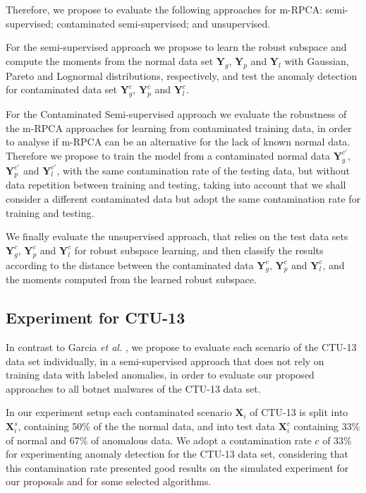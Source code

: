 Therefore, we propose to evaluate the following approaches for m-RPCA: semi-supervised; contaminated semi-supervised; and unsupervised.

For the semi-supervised approach we propose to learn the robust subspace and compute the moments from the normal data set $\pmb{Y}_g$, $\pmb{Y}_p$ and $\pmb{Y}_l$ with Gaussian, Pareto and Lognormal distributions, respectively, and test the anomaly detection for contaminated data set $\pmb{Y}_g^c$, $\pmb{Y}_p^c$ and $\pmb{Y}_l^c$.

For the Contaminated Semi-supervised approach we evaluate the robustness of the m-RPCA approaches for learning from contaminated training data, in order to analyse if m-RPCA can be an alternative for the lack of known normal data. Therefore we propose to train the model from a contaminated normal data $\pmb{Y}_g^{c'}$, $\pmb{Y}_p^{c'}$ and $\pmb{Y}_l^{c'}$, with the same contamination rate of the testing data, but without data repetition between training and testing, taking into account that we shall consider a different contaminated data but adopt the same contamination rate for training and testing.

We finally evaluate the unsupervised approach, that relies on the test data sets $\pmb{Y}_g^c$, $\pmb{Y}_p^c$ and $\pmb{Y}_l^c$ for robust subspace learning, and then classify the results according to the distance between the contaminated data $\pmb{Y}_g^c$, $\pmb{Y}_p^c$ and $\pmb{Y}_l^c$, and the moments computed from the learned robust subspace.

\subsection{Experiment for CTU-13}
\label{sec:4_CTU13Scenario}

In contrast to Garcia \emph{et al.} \cite{garcia2014empirical}, we propose to evaluate each scenario of the CTU-13 data set individually, in a semi-supervised approach that does not rely on training data with labeled anomalies, in order to evaluate our proposed approaches to all botnet malwares of the CTU-13 data set. 

In our experiment setup each contaminated scenario $\pmb{X}_i$ of CTU-13 is split into $\pmb{X}_i^s$, containing 50\% of the the normal data, and into test data $\pmb{X}_i^c$ containing 33\% of normal and 67\% of anomalous data. We adopt a contamination rate $c$ of 33\% for  experimenting anomaly detection for the CTU-13 data set, considering that this contamination rate presented good results on the simulated experiment for our proposals and for some selected algorithms.

